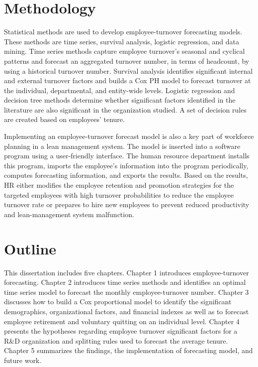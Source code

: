 \section{Methodology}
Statistical methods are used to develop employee-turnover forecasting models. These methods are time series, survival analysis, logistic regression, and data mining. Time series methods capture employee turnover's seasonal and cyclical patterns and forecast an aggregated turnover number, in terms of headcount, by using a historical turnover number. Survival analysis identifies significant internal and external turnover factors and builds a Cox PH model to forecast turnover at the individual, departmental, and entity-wide levels. Logistic regression and decision tree methods determine whether significant factors identified in the literature are also significant in the organization studied. A set of decision rules are created based on employees' tenure. 
   
Implementing an employee-turnover forecast model is also a key part of workforce planning in a lean management system. The model is inserted into a software program using a user-friendly interface. The human resource department installs this program, imports the employee's information into the program periodically, computes forecasting information, and exports  the results. Based on the results, HR either modifies the employee retention and promotion strategies for the targeted employees with high turnover probabilities to reduce the employee turnover rate or prepares to hire new employees to prevent reduced productivity and lean-management system malfunction.


\section{Outline}
This dissertation includes five chapters. Chapter 1 introduces employee-turnover forecasting. Chapter 2 introduces time series methods and identifies an optimal time series model to forecast the monthly employee-turnover number. Chapter 3 discusses how to build a Cox proportional model to identify the significant demographics, organizational factors, and financial indexes as well as to forecast employee retirement and voluntary quitting on an individual level. Chapter 4 presents the hypotheses regarding employee turnover significant factors for a R\&D organization and splitting rules used to forecast the average tenure. Chapter 5 summarizes the findings, the implementation of forecasting model, and future work.

